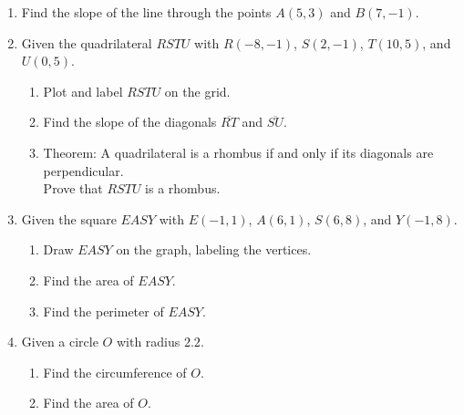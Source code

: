 \documentclass[12pt, oneside]{article}
\begin{document}
\begin{enumerate}
  \item Find the slope of the line through the points $A(5,3)$ and $B(7,-1)$. \vspace{3cm}

\newpage

  \item Given the quadrilateral $RSTU$ with $R(-8,-1)$, $S(2,-1)$, $T(10,5)$, and $U(0,5)$.
  \begin{enumerate}
    \item Plot and label $RSTU$ on the grid.
    \item Find the slope of the diagonals $\overline{RT}$ and $\overline{SU}$.
    \item Theorem: A quadrilateral is a rhombus if and only if its diagonals are perpendicular.\\[0.5cm]
    Prove that $RSTU$ is a rhombus.
  \end{enumerate}

  \begin{center} %
  \end{center}

\newpage

  \item Given the square $EASY$ with $E(-1, 1)$, $A(6, 1)$, $S(6, 8)$, and $Y(-1, 8)$.
    \begin{enumerate}
      \item Draw $EASY$ on the graph, labeling the vertices.
      \item Find the area of $EASY$. \vspace{2cm}
      \item Find the perimeter of $EASY$. \vspace{2cm}
    \end{enumerate}

  \item Given a circle $O$ with radius $2.2$.
  \begin{enumerate}
    \item Find the circumference of $O$. \vspace{2cm}
    \item Find the area of $O$.
  \end{enumerate}


\end{enumerate}
\end{document}
